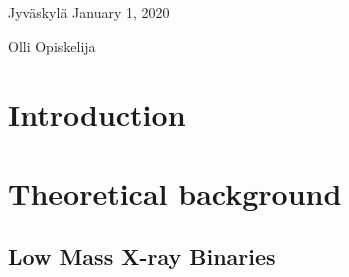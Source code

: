 \documentclass[final]{thesis} %
\begin{document}
\bigskip

\noindent Jyväskylä January 1, 2020

\bigskip

\noindent Olli Opiskelija

\tableofcontents

\section{Introduction}
\label{sec:introduction}


\begin{comment}
Johdannon tehtävänä on nimensä mukaisesti johdatella lukija käsillä olevan tutkimuksen maailmaan. Tutkiminen ja kirjoittaminen kuuluvat yhteen. Tutkimus on monella alalla, varsinkin niin sanotuissa ihmistieteissä, pelkistetysti sanottuna kirjoitusprosessi. Sen päämäärä on ajattelun tulos, kirkastunut ydin niistä ajatuksista ja johtopäätöksistä, joita prosessin aikana on syntynyt. Kirjoittaminen jäsentää ajattelua ja synnyttää uusia ideoita. Siksi kirjoittaminen on olennainen osa sekä opiskelua, tutkimusta että lopulta myös ammattitaitoa. Kirjoitustaitoa tarvitaan läpi työelämän: lähes kaikissa akateemisissa ammateissa laaditaan muistioita, virkakirjeitä, raportteja, tiedotteita tai suunnitelmia.

Kielijelpin kirjoitusviestinnän sivuilla keskitytään tieteellisen kirjoittamisen perusasioihin, kirjoitusprosessiin ja tekstin viimeistelyyn. Kielijelppi lähestyy tieteellistä kirjoittamista laadullisen tutkimuksen näkökulmasta, koska Kielijelpin kirjoitusviestinnän tekijöiden tausta ja kokemus ovat laadullisen humanistisen tutkimuksen parissa. Sivustosta on toivottavasti kuitenkin iloa myös muunlaista tutkimusta tekeville.

\lipsum[1]
\end{comment}


\section{Theoretical background}
\label{sec:theory-background}


\subsection{Low Mass X-ray Binaries}
\label{subsec:lmxbs}
\end{document}
